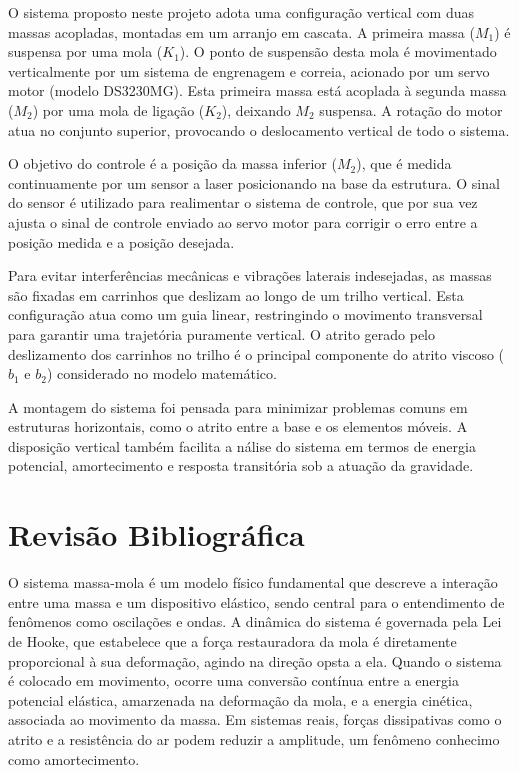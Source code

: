\documentclass[9pt,a4paper,twocolumn,twoside]{tau-class/tau}
\begin{document}
O sistema proposto neste projeto adota uma configuração vertical com duas massas acopladas, montadas em um arranjo em cascata. A primeira massa ($M_1$) é suspensa por uma mola ($K_1$). O ponto de suspensão desta mola é movimentado verticalmente por um sistema de engrenagem e correia, acionado por um servo motor (modelo DS3230MG). Esta primeira massa está acoplada à segunda massa ($M_2$) por uma mola de ligação ($K_2$), deixando $M_2$ suspensa. A rotação do motor atua no conjunto superior, provocando o deslocamento vertical de todo o sistema.

O objetivo do controle é a posição da massa inferior ($M_2$), que é medida continuamente por um sensor a laser posicionando na base da estrutura. O sinal do sensor é utilizado para realimentar o sistema de controle, que por sua vez ajusta o sinal de controle enviado ao servo motor para corrigir o erro entre a posição medida e a posição desejada.

Para evitar interferências mecânicas e vibrações laterais indesejadas, as massas são fixadas em carrinhos que deslizam ao longo de um trilho vertical. Esta configuração atua como um guia linear, restringindo o movimento transversal para garantir uma trajetória puramente vertical. O atrito gerado pelo deslizamento dos carrinhos no trilho é o principal componente do atrito viscoso ($b_1$ e $b_2$) considerado no modelo matemático.

A montagem do sistema foi pensada para minimizar problemas comuns em estruturas horizontais, como o atrito entre a base e os elementos móveis. A disposição vertical também facilita a nálise do sistema em termos de energia potencial, amortecimento e resposta transitória sob a atuação da gravidade.



\section{Revisão Bibliográfica}

O sistema massa-mola é um modelo físico fundamental que descreve a interação entre uma massa e um dispositivo elástico, sendo central para o entendimento de fenômenos como oscilações e ondas. A dinâmica do sistema é governada pela Lei de Hooke, que estabelece que a força restauradora da mola é diretamente proporcional à sua deformação, agindo na direção opsta a ela. Quando o sistema é colocado em movimento, ocorre uma conversão contínua entre a energia potencial elástica, amarzenada na deformação da mola, e a energia cinética, associada ao movimento da massa. Em sistemas reais, forças dissipativas como o atrito e a resistência do ar podem reduzir a amplitude, um fenômeno conhecimo como amortecimento. \cite{SistemaMassaMola}
\end{document}
